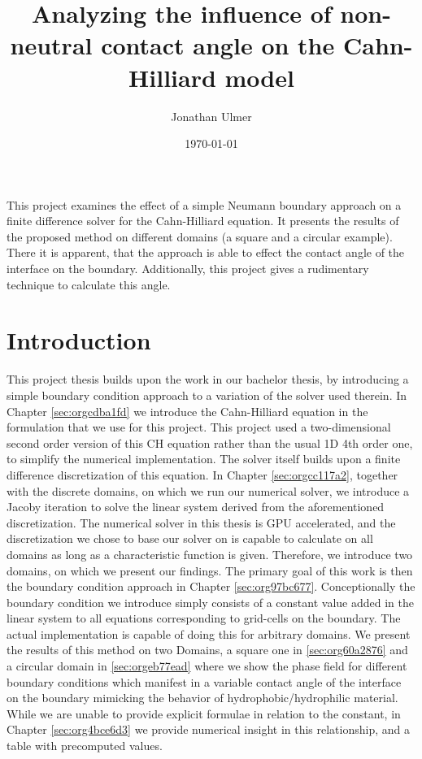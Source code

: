 \documentclass{mimosis}
\author{Jonathan Ulmer}
\date{\today}
\title{Analyzing the influence of non-neutral contact angle on the Cahn-Hilliard model}
\newenvironment{abstract} {}{}
\begin{document}
\maketitle
\setcounter{tocdepth}{1}
\tableofcontents

\begin{abstract}
This project examines the effect of a simple Neumann boundary approach on a finite difference solver for the Cahn-Hilliard equation. It presents the results of the proposed method on different domains (a square and a circular example). There it is apparent, that the approach is able to effect the contact angle of the interface on the boundary. Additionally, this project gives a rudimentary technique to calculate this angle.
\end{abstract}
\chapter{Introduction}
\label{sec:org195e9e2}
This project thesis builds upon the work in our bachelor thesis, by introducing a simple boundary condition approach to a variation of the solver used therein. In Chapter \ref{sec:orgcdba1fd} we introduce the Cahn-Hilliard equation in the formulation that we use for this project. This project used a two-dimensional second order version of this CH equation rather than the usual 1D 4th order one, to simplify the numerical implementation. The solver itself builds upon a finite difference discretization of this equation. In Chapter \ref{sec:orgcc117a2}, together with the discrete domains, on which we run our numerical solver, we introduce a Jacoby iteration to solve the linear system derived from the aforementioned discretization.  The numerical solver in this thesis is GPU accelerated, and the discretization we chose to base our solver on is capable to calculate on all domains as long as a characteristic function is given. Therefore, we introduce two domains, on which we present our findings. The primary goal of this work is then the boundary condition approach in Chapter \ref{sec:org97bc677}. Conceptionally the boundary condition we introduce simply consists of a constant value added in the linear system to all equations corresponding to grid-cells on the boundary. The actual implementation is capable of doing this for arbitrary domains. We present the results of this method on two Domains, a square one in \ref{sec:org60a2876} and a circular domain in \ref{sec:orgeb77ead} where we show the phase field for different boundary conditions which manifest in a variable contact angle of the interface on the boundary mimicking the behavior of hydrophobic/hydrophilic material. While we are unable to provide explicit formulae in relation to the constant, in Chapter \ref{sec:org4bce6d3} we provide numerical insight in this relationship, and a table with precomputed values.
\end{document}
